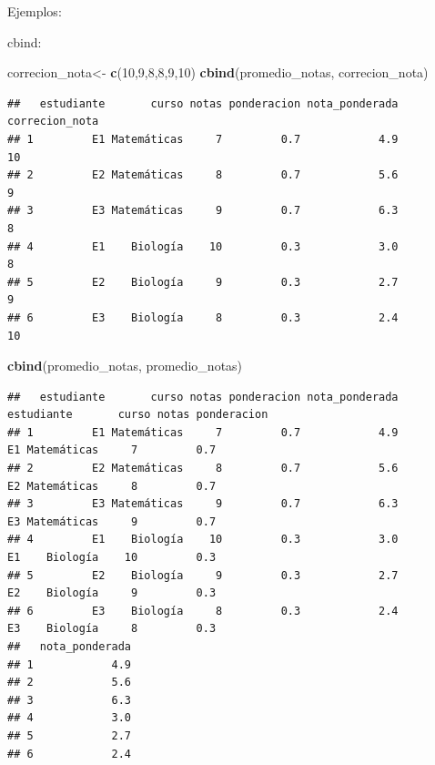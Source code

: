 \documentclass[
]{book}
\newenvironment{Shaded}{\begin{snugshade}}{\end{snugshade}}
\newcommand{\DecValTok}[1]{\textcolor[rgb]{0.00,0.00,0.81}{#1}}
\newcommand{\FunctionTok}[1]{\textcolor[rgb]{0.13,0.29,0.53}{\textbf{#1}}}
\newcommand{\NormalTok}[1]{#1}
\newcommand{\OtherTok}[1]{\textcolor[rgb]{0.56,0.35,0.01}{#1}}
\begin{document}
Ejemplos:

cbind:

\begin{Shaded}
\begin{Highlighting}[]
\NormalTok{correcion\_nota}\OtherTok{\textless{}{-}} \FunctionTok{c}\NormalTok{(}\DecValTok{10}\NormalTok{,}\DecValTok{9}\NormalTok{,}\DecValTok{8}\NormalTok{,}\DecValTok{8}\NormalTok{,}\DecValTok{9}\NormalTok{,}\DecValTok{10}\NormalTok{)}
\FunctionTok{cbind}\NormalTok{(promedio\_notas, correcion\_nota)}
\end{Highlighting}
\end{Shaded}

\begin{verbatim}
##   estudiante       curso notas ponderacion nota_ponderada correcion_nota
## 1         E1 Matemáticas     7         0.7            4.9             10
## 2         E2 Matemáticas     8         0.7            5.6              9
## 3         E3 Matemáticas     9         0.7            6.3              8
## 4         E1    Biología    10         0.3            3.0              8
## 5         E2    Biología     9         0.3            2.7              9
## 6         E3    Biología     8         0.3            2.4             10
\end{verbatim}

\begin{Shaded}
\begin{Highlighting}[]
\FunctionTok{cbind}\NormalTok{(promedio\_notas, promedio\_notas)}
\end{Highlighting}
\end{Shaded}

\begin{verbatim}
##   estudiante       curso notas ponderacion nota_ponderada estudiante       curso notas ponderacion
## 1         E1 Matemáticas     7         0.7            4.9         E1 Matemáticas     7         0.7
## 2         E2 Matemáticas     8         0.7            5.6         E2 Matemáticas     8         0.7
## 3         E3 Matemáticas     9         0.7            6.3         E3 Matemáticas     9         0.7
## 4         E1    Biología    10         0.3            3.0         E1    Biología    10         0.3
## 5         E2    Biología     9         0.3            2.7         E2    Biología     9         0.3
## 6         E3    Biología     8         0.3            2.4         E3    Biología     8         0.3
##   nota_ponderada
## 1            4.9
## 2            5.6
## 3            6.3
## 4            3.0
## 5            2.7
## 6            2.4
\end{verbatim}
\end{document}

